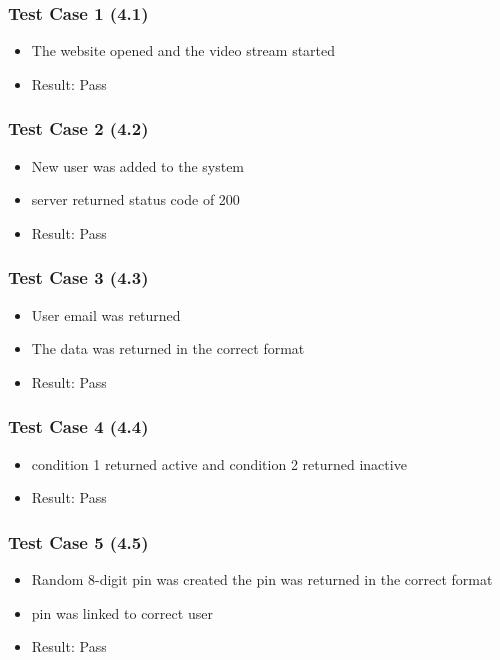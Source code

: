 \documentclass[a4paper,12pt]{article}
\begin{document}
			\subsubsection{Test Case 1 (4.1)}
				\begin{itemize}
					\item The website opened and the video stream started
					\item Result: Pass
				\end{itemize}
			
			\subsubsection{Test Case 2 (4.2)}
				\begin{itemize}
					\item New user was added to the system
					\item server returned status code of 200
					\item 	Result: Pass
				\end{itemize}
			
			\subsubsection{Test Case 3 (4.3)}
				\begin{itemize}
					\item User email was returned
					\item The data was returned in the correct format
					\item 	Result: Pass
				\end{itemize}
			
			\subsubsection{Test Case 4 (4.4)}
				\begin{itemize}
					\item condition 1 returned active and condition 2 returned inactive
					\item 	Result: Pass
				\end{itemize}
			
			\subsubsection{Test Case 5 (4.5)}
				\begin{itemize}
					\item Random 8-digit pin was created
					the pin was returned in the correct format
					\item pin was linked to correct user
					\item 	Result: Pass
				\end{itemize}
			
\end{document}
